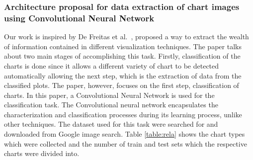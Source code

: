 \documentclass[12pt, a4paper,oneside]{report}
\begin{document}
\subsubsection{Architecture proposal for data extraction of chart images using Convolutional Neural Network}
Our work is inspired by De Freitas et al.~\cite{junior2017archi}, proposed a way to extract the wealth of information contained in different visualization techniques. The paper talks about two main stages of accomplishing this task. Firstly, classification of the charts is done since it allows a different variety of chart to be detected automatically allowing the next step, which is the extraction of data from the classified plots. The paper, however, focuses on the first step, classification of charts. In this paper, a Convolutional Neural Network is used for the classification task. The Convolutional neural network encapsulates the characterization and classification processes during its learning process, unlike other techniques. The dataset used for this task were searched for and downloaded from Google image search. Table \ref{table:rela} shows the chart types which were collected and the number of train and test sets which the respective charts were divided into.
\end{document}
